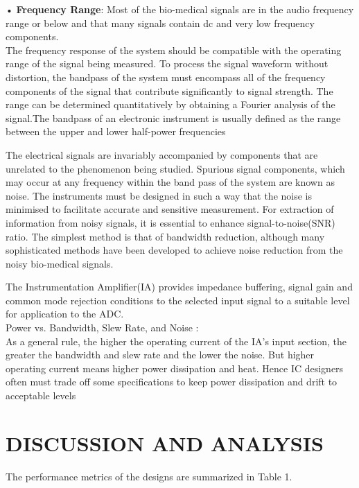 \documentclass[]{article}
\begin{document}
		•	\textbf{Frequency Range}: Most of the bio-medical signals are in the audio frequency range or below and that many signals contain dc and very low frequency components.\\
		
		The frequency response of the system should be compatible with the operating range of the signal being measured. To process the signal waveform without distortion, the bandpass of the system must encompass all of the frequency components of the signal that contribute significantly to signal strength. The range can be determined quantitatively by obtaining a Fourier analysis of the signal.The bandpass of an electronic instrument is usually defined as the range between the upper and lower half-power frequencies
		
		The electrical signals are invariably accompanied by components that are unrelated to the phenomenon being studied. Spurious signal components, which may occur at any frequency within the band pass of the system are known as noise.
		The instruments must be designed in such a way that the noise is minimised to facilitate accurate and sensitive measurement. For extraction of information from noisy signals, it is essential to enhance signal-to-noise(SNR) ratio. The simplest method is that of bandwidth reduction, although many sophisticated methods have been developed to achieve noise reduction from the noisy bio-medical signals. \cite{khandpur2014}
		
		The Instrumentation Amplifier(IA) provides impedance buffering, signal gain and common mode rejection conditions to the selected input signal to a suitable level for application to the ADC.\\
		
		Power vs. Bandwidth, Slew Rate, and Noise :\\
		
			As a general rule, the higher the operating current of the IA's input section, the greater the bandwidth 
			and slew rate and the lower the noise. But higher operating 
			current means higher power dissipation and heat. Hence IC designers often must trade off some specifications to keep power dissipation and drift to acceptable levels
		
\section{DISCUSSION AND ANALYSIS}
 The performance metrics of the designs are summarized in Table 1.
\end{document}

